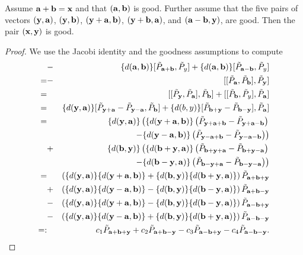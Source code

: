 \begin{lemma}\label{lemma_trueforab}
	Assume $\aab + \bb = \xx$ and that $(\aab,\bb)$ is good. Further assume that the five pairs of vectors $(\yy, \aab)$, $(\yy, \bb)$, $(\yy+\aab,\bb)$, $(\yy+\bb,\aab)$, and $(\aab-\bb, \yy)$, are good. Then the pair $(\xx,\yy)$ is good.
\end{lemma}
\begin{proof}
We  use the Jacobi identity and the goodness assumptions to compute
	\begin{eqnarray*}
&-&\{d(\aab, \bb)\} [\tilde{P}_{\aab+\bb}, \tilde{P}_y] + \{d(\aab, \bb)\} [\tilde{P}_{\aab-\bb}, \tilde{P}_y] \\
=&-&[[\tilde{P}_{\aab}, \tilde{P}_{\bb}], \tilde{P}_{\yy}] \\
=&&[[\tilde{P}_{\yy}, \tilde{P}_{\aab}], \tilde{P}_{\bb}] + [[\tilde{P}_{\bb}, \tilde{P}_y], \tilde{P}_{\aab}] \\
=&&\{d(\yy, \aab)\} [\tilde{P}_{\yy+\aab} - \tilde{P}_{\yy-\aab}, \tilde{P}_{\bb}] + \{d(b,y)\} [\tilde{P}_{\bb+\yy} - \tilde{P}_{\bb-\yy}], \tilde{P}_{\aab}] \\
=&&\{d(\yy,\aab)\} \left( \{d(\yy+\aab, \bb)\} \left( \tilde{P}_{\yy+\aab+\bb} - \tilde{P}_{\yy+\aab-\bb} \right) \right. \\
&& \left. \qquad\qquad -\{d(\yy-\aab,\bb)\} \left( \tilde{P}_{\yy-\aab+\bb} - \tilde{P}_{\yy-\aab-\bb} \right) \right) \\
&+&\{d(\bb,\yy)\} \left( \{d(\bb+\yy, \aab)\} \left( \tilde{P}_{\bb+\yy+\aab} - \tilde{P}_{\bb+\yy-\aab} \right) \right. \\
&& \left. \qquad\qquad -\{d(\bb-\yy, \aab)\} \left( \tilde{P}_{\bb-\yy+\aab} - \tilde{P}_{\bb-\yy-\aab} \right) \right) \\
=&& \left( \{d(\yy,\aab)\} \{d(\yy+\aab,\bb)\} + \{d(\bb,\yy)\} \{d(\bb+\yy,\aab)\} \right) \tilde{P}_{\aab+\bb+\yy} \\
&+& \left( \{d(\yy,\aab)\} \{d(\yy-\aab,\bb)\} - \{d(\bb,\yy)\} \{d(\bb-\yy,\aab)\} \right) \tilde{P}_{\aab+\bb-\yy} \\
&-& \left( \{d(\yy,\aab)\} \{d(\yy+\aab,\bb)\} - \{d(\bb,\yy)\} \{d(\bb-\yy,\aab)\} \right) \tilde{P}_{\aab-\bb+\yy} \\
&-& \left( \{d(\yy,\aab)\} \{d(\yy-\aab,\bb)\} + \{d(\bb,\yy)\} \{d(\bb+\yy,\aab)\} \right) \tilde{P}_{\aab-\bb-\yy} \\
=:&& c_1 \tilde{P}_{\aab+\bb+\yy} + c_2 \tilde{P}_{\aab+\bb-\yy} - c_3 \tilde{P}_{\aab-\bb+\yy} - c_4 \tilde{P}_{\aab-\bb-\yy}.
	\end{eqnarray*}

\end{proof}
